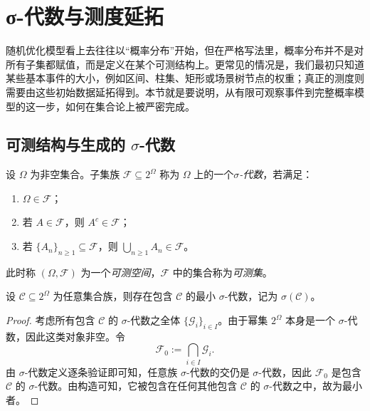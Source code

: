 \section{σ-代数与测度延拓}

\label{sec:2-1}

随机优化模型看上去往往以“概率分布”开始，但在严格写法里，概率分布并不是对所有子集都赋值，而是定义在某个可测结构上。更常见的情况是，我们最初只知道某些基本事件的大小，例如区间、柱集、矩形或场景树节点的权重；真正的测度则需要由这些初始数据延拓得到。本节就是要说明，从有限可观察事件到完整概率模型的这一步，如何在集合论上被严密完成。

\subsection{可测结构与生成的 $\sigma$-代数}

\begin{definition}[$\sigma$-代数]\label{def:sigma-algebra}
设 $\Omega$ 为非空集合。子集族 $\mathscr F\subseteq 2^\Omega$ 称为 $\Omega$ 上的一个\emph{$\sigma$-代数}，若满足：
\begin{enumerate}
  \item $\Omega\in \mathscr F$；
  \item 若 $A\in \mathscr F$，则 $A^c\in \mathscr F$；
  \item 若 $\{A_n\}_{n\ge 1}\subseteq \mathscr F$，则 $\bigcup_{n\ge1}A_n\in \mathscr F$。
\end{enumerate}
此时称 $(\Omega,\mathscr F)$ 为一个\emph{可测空间}，$\mathscr F$ 中的集合称为\emph{可测集}。
\end{definition}

\begin{proposition}\label{prop:generated-sigma-algebra}
设 $\mathscr C\subseteq 2^\Omega$ 为任意集合族，则存在包含 $\mathscr C$ 的最小 $\sigma$-代数，记为 $\sigma(\mathscr C)$。
\end{proposition}

\begin{proof}
考虑所有包含 $\mathscr C$ 的 $\sigma$-代数之全体 $\{\mathscr G_i\}_{i\in I}$。由于幂集 $2^\Omega$ 本身是一个 $\sigma$-代数，因此这类对象非空。令
\[
\mathscr F_0:=\bigcap_{i\in I}\mathscr G_i.
\]
由 $\sigma$-代数定义逐条验证即可知，任意族 $\sigma$-代数的交仍是 $\sigma$-代数，因此 $\mathscr F_0$ 是包含 $\mathscr C$ 的 $\sigma$-代数。由构造可知，它被包含在任何其他包含 $\mathscr C$ 的 $\sigma$-代数之中，故为最小者。
\end{proof}

